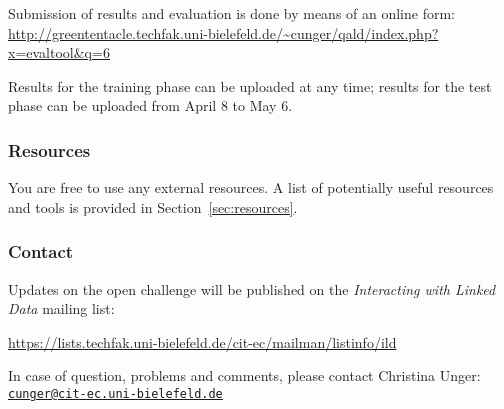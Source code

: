 \documentclass[a4paper]{article}
\begin{document}
{Submission of results and evaluation is done by means of an online form:\\
\url{http://greententacle.techfak.uni-bielefeld.de/~cunger/qald/index.php?x=evaltool&q=6}

Results for the training phase can be uploaded at any time; results for the test phase can be uploaded from April 8 to May 6.

%

\subsubsection*{Resources}

You are free to use any external resources. A list of potentially useful resources and tools is provided in Section~\ref{sec:resources}.

\subsubsection*{Contact}

Updates on the open challenge will be published on the \emph{Interacting with Linked Data} mailing list:
\begin{center}
\url{https://lists.techfak.uni-bielefeld.de/cit-ec/mailman/listinfo/ild}
\end{center}
In case of question, problems and comments, please contact Christina Unger:\\
{\tt \href{mailto::cunger@cit-ec.uni-bielefeld.de?subject=QALD-6}{cunger@cit-ec.uni-bielefeld.de}}

\newpage


}
\end{document}
